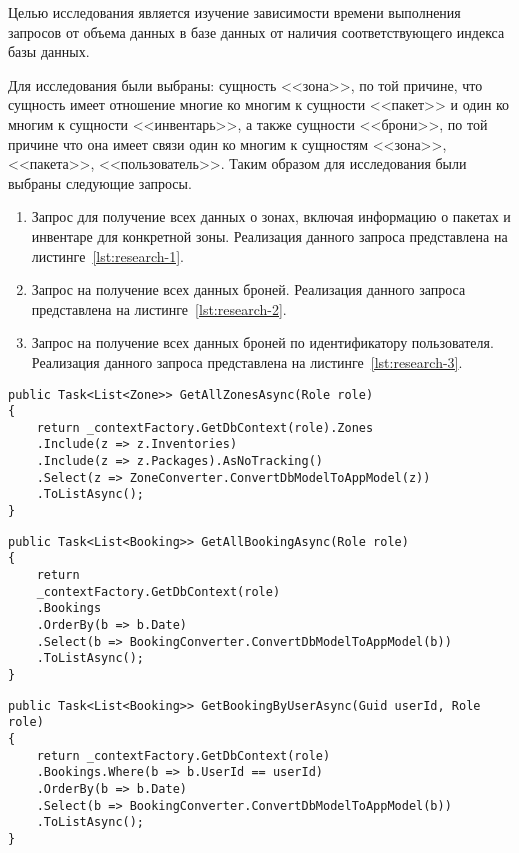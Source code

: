 Целью исследования является изучение зависимости времени выполнения запросов от объема данных в базе данных от наличия соответствующего индекса базы данных.

Для исследования были выбраны: сущность <<зона>>, по той причине, что сущность имеет отношение многие ко многим к сущности <<пакет>> и один ко многим к сущности <<инвентарь>>, а также сущности <<брони>>, по той причине что она имеет связи один ко многим к сущностям <<зона>>, <<пакета>>, <<пользователь>>. Таким образом для исследования были выбраны следующие запросы.
\begin{enumerate}
	\item Запрос для получение всех данных о зонах, включая информацию о пакетах и инвентаре для конкретной зоны. Реализация данного запроса представлена на листинге~\ref{lst:research-1}.
	\item Запрос на получение всех данных броней. Реализация данного запроса представлена на листинге~\ref{lst:research-2}.
	\item Запрос на получение всех данных броней по идентификатору пользователя. Реализация данного запроса представлена на листинге~\ref{lst:research-3}.
\end{enumerate}

\begin{center}
	\begin{lstlisting}[label=lst:research-1, caption=Запрос на получение всех зон включая информацию пакетах и инвентаре]
public Task<List<Zone>> GetAllZonesAsync(Role role)
{
	return _contextFactory.GetDbContext(role).Zones
	.Include(z => z.Inventories)
	.Include(z => z.Packages).AsNoTracking()
	.Select(z => ZoneConverter.ConvertDbModelToAppModel(z))
	.ToListAsync();
}
	\end{lstlisting}
\end{center}

\begin{center}
	\begin{lstlisting}[label=lst:research-2, caption=Запрос на получение всех броней]
public Task<List<Booking>> GetAllBookingAsync(Role role)
{
	return 
	_contextFactory.GetDbContext(role)
	.Bookings
	.OrderBy(b => b.Date)
	.Select(b => BookingConverter.ConvertDbModelToAppModel(b))
	.ToListAsync();
}
	\end{lstlisting}
\end{center}

\begin{center}
	\begin{lstlisting}[label=lst:research-3, caption=Запрос на получение броней пользователя]
public Task<List<Booking>> GetBookingByUserAsync(Guid userId, Role role) 
{
	return _contextFactory.GetDbContext(role)
	.Bookings.Where(b => b.UserId == userId)
	.OrderBy(b => b.Date)
	.Select(b => BookingConverter.ConvertDbModelToAppModel(b))
	.ToListAsync();
}
	\end{lstlisting}
\end{center}

